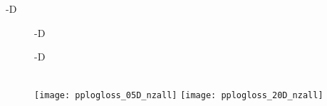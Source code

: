 \documentclass[sigconf]{acmart}
\newcommand{\bbobdatapath}{ppdata/} %
\begin{document}
{\begin{table*}
{\begin{minipage}[t]{0.499\textwidth}
\pptablefooter
\end{minipage}

\hspace{0.002\textwidth}

\begin{minipage}[t]{0.499\textwidth}
-D\\
\tiny
\pptableheader 
 




























\pptablefooter
\end{minipage}}
\vspace{1em}

\caption[Table of aRTs]{\label{tab:aRTs}
}
\end{table*}




\begin{figure}
\centering
\parbox{0.49\columnwidth}{-D}%
\parbox{0.49\columnwidth}{-D}\\
\texttt{[image: pplogloss\_05D\_nzall]}%
\texttt{[image: pplogloss\_20D\_nzall]}
%
\\

\caption{\label{tab:aRTloss}%
\bbobloglosstablecaption{}
}
\end{figure}



}
\end{document}
